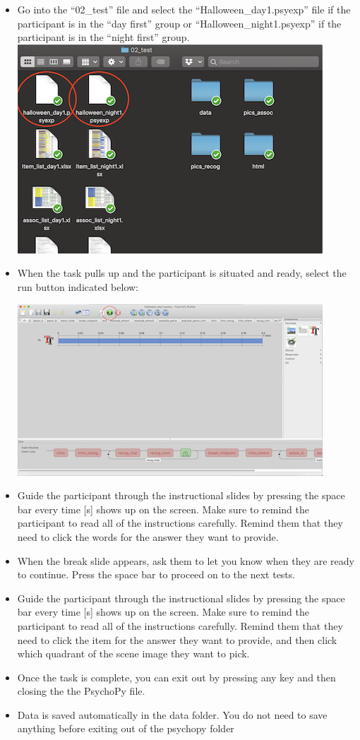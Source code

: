 \documentclass[]{book}
\begin{document}
\begin{itemize}
\item
  Go into the ``02\_test'' file and select the ``Halloween\_day1.psyexp'' file if the participant is in the ``day first'' group or ``Halloween\_night1.psyexp'' if the participant is in the ``night first'' group.
  \includegraphics{images/halloween/5.png}
\item
  When the task pulls up and the participant is situated and ready, select the run button indicated below:

  \includegraphics{images/halloween/6.png}
\item
  Guide the participant through the instructional slides by pressing the space bar every time {[}s{]} shows up on the screen. Make sure to remind the participant to read all of the instructions carefully. Remind them that they need to click the words for the answer they want to provide.
\item
  When the break slide appears, ask them to let you know when they are ready to continue. Press the space bar to proceed on to the next tests.
\item
  Guide the participant through the instructional slides by pressing the space bar every time {[}s{]} shows up on the screen. Make sure to remind the participant to read all of the instructions carefully. Remind them that they need to click the item for the answer they want to provide, and then click which quadrant of the scene image they want to pick.
\item
  Once the task is complete, you can exit out by pressing any key and then closing the the PsychoPy file.
\item
  Data is saved automatically in the data folder. You do not need to save anything before exiting out of the psychopy folder
\end{itemize}
\end{document}
